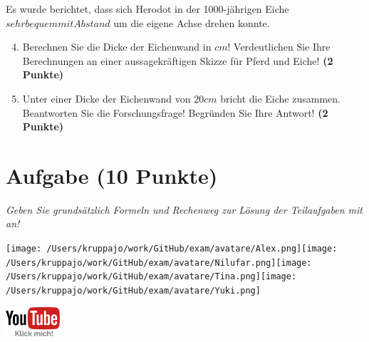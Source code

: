 \documentclass[a4paper, 9pt]{scrartcl}\usepackage[]{graphicx}\usepackage[]{xcolor}
\begin{document}
Es wurde berichtet, dass sich Herodot in der 1000-jährigen Eiche $sehr bequem mit Abstand$ um die eigene Achse drehen konnte.

\begin{enumerate}
  \setcounter{enumi}{3}
\item Berechnen Sie die Dicke der Eichenwand in $cm$! Verdeutlichen Sie Ihre Berechnungen an einer aussagekräftigen Skizze für Pferd und Eiche! \textbf{(2 Punkte)} 
\item Unter einer Dicke der Eichenwand von $20cm$ bricht die Eiche zusammen. Beantworten Sie die Forschungsfrage! Begründen Sie Ihre Antwort! \textbf{(2 Punkte)} 
\end{enumerate}
 
\clearpage

\section{Aufgabe \hfill (10 Punkte)}

\textit{Geben Sie grundsätzlich Formeln und Rechenweg zur Lösung der Teilaufgaben mit an!} \\[1Ex]
 

 
\ifcollection
\begin{flushright}
\tiny\vspace{-3Ex}
\textbf{\examinhaltstart}
\exammodulemathstat
\vspace{-4Ex}
\end{flushright}
\begin{minipage}[t]{0.5\textwidth}
\texttt{[image: /Users/kruppajo/work/GitHub/exam/avatare/Alex.png]}\hspace{-4mm}\texttt{[image: /Users/kruppajo/work/GitHub/exam/avatare/Nilufar.png]}\hspace{-4mm}\texttt{[image: /Users/kruppajo/work/GitHub/exam/avatare/Tina.png]}\hspace{-4mm}\texttt{[image: /Users/kruppajo/work/GitHub/exam/avatare/Yuki.png]}
\end{minipage}
\begin{minipage}[t]{0.5\textwidth}
\hfill
\href{https://youtu.be/57B-yYoFSk0}{\includegraphics[width = 2cm]{img/youtube}}
\end{minipage}
\fi
\end{document}
